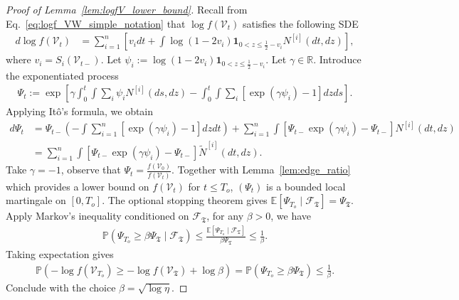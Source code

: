 \documentclass[11pt]{article}
\newcommand{\stopT}{{\boldsymbol{\mathfrak{T}}}}
\newcommand{\sF}{\mathscr{F}}
\newcommand{\To}{{T_o}}
\newcommand{\psiV}{\psi}
\newcommand{\PsiV}{\Psi}
\newcommand{\rV}{\mathscr{V}}
\newcommand{\Ni}{N^{[i]}}
\newcommand{\wNi}{\widetilde{N}^{[i]}}
\theoremstyle{named}
\theoremstyle{plain}
\newcommand{\defn}{:=}
\newcommand{\real}{\ensuremath{\mathbb{R}}}
\newcommand{\Exs}{\ensuremath{{\mathbb{E}}}}
\newcommand{\Prob}{\ensuremath{{\mathbb{P}}}}
\newcommand{\brackets}[1]{\left[ #1 \right]}
\newcommand{\parenth}[1]{\left( #1 \right)}
\begin{document}
\begin{proof}[Proof of Lemma~\ref{lem:logfV_lower_bound}\label{proof_lem:logfV_lower_bound}]
  Recall from Eq.~\eqref{eq:logf_VW_simple_notation} that $\log f(\rV_t)$ satisfies the following SDE
  \begin{align*}
    d \log f(\rV_t) &= \sum_{i=1}^n \brackets{v_i dt + \int \log \parenth{1-2v_i} \mathbf{1}_{0 < z \leq \frac12 - v_i} \Ni(dt, dz) },
  \end{align*}
  where $v_i = S_i(\rV_{t-})$. Let $\psiV_i \defn \log \parenth{1-2v_i} \mathbf{1}_{0 < z \leq \frac12 - v_i}$. Let $\gamma \in \real$.  Introduce the exponentiated process
  \begin{align*}
    \PsiV_t \defn \exp\brackets{\gamma \int_0^t \int \sum_i \psiV_i \Ni(ds, dz) - \int_0^t \int \sum_i \brackets{\exp(\gamma \psiV_i) - 1} dz ds }.
  \end{align*}
  Applying It\^o's formula, we obtain
  \begin{align*}
    d \PsiV_t &= \PsiV_{t-} \parenth{- \int \sum_{i=1}^n \brackets{\exp(\gamma \psiV_i) - 1} dz dt} + \sum_{i=1}^n \int \brackets{\PsiV_{t-} \exp(\gamma \psiV_i) - \PsiV_{t-}} \Ni(dt, dz) \\
    &= \sum_{i=1}^n \int \brackets{\PsiV_{t-} \exp(\gamma \psiV_i) - \PsiV_{t-}} \wNi(dt, dz).
  \end{align*}
  Take $\gamma = -1$, observe that $\PsiV_t = \frac{f(\rV_0)}{f(\rV_t)}$. Together with Lemma~\ref{lem:edge_ratio} which provides a lower bound on $f(\rV_t)$ for $t \leq \To$, $(\PsiV_t)$ is a bounded local martingale on $[0, \To]$. The optional stopping theorem gives $\Exs[\PsiV_{\To} \mid \sF_{\stopT}] = \PsiV_{\stopT}$. 
  Apply Markov's inequality conditioned on $\sF_\stopT$, for any $\beta > 0$, we have
  \begin{align*}
    \Prob(\PsiV_{\To} \geq \beta \PsiV_{\stopT} \mid \sF_{\stopT}) \leq \frac{\Exs[\PsiV_{\To} \mid \sF_{\stopT}]}{\beta \PsiV_{\stopT}}  \leq \frac{1}{\beta}. 
  \end{align*}
  Taking expectation gives
  \begin{align*}
    \Prob(- \log f(\rV_{\To})  \geq - \log f(\rV_{\stopT}) + \log \beta) = \Prob(\PsiV_{\To} \geq \beta \PsiV_{\stopT}) \leq \frac{1}{\beta}. 
  \end{align*}
  Conclude with the choice $\beta = \sqrt{\log \eta}$.
\end{proof}
\end{document}
